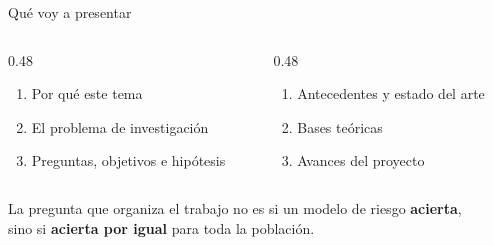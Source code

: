 \documentclass[aspectratio=169,11pt]{beamer}
\newcommand{\resalta}[1]{{\color{vino}\bfseries #1}}
\begin{document}
\begin{frame}{Qué voy a presentar}
  \vspace{0.6em}
  \begin{columns}[T,onlytextwidth]
    \begin{column}{0.48\textwidth}
      \begin{enumerate}
        \item[\textcolor{naranja}{\bfseries 1.}] Por qué este tema
        \item[\textcolor{naranja}{\bfseries 2.}] El problema de investigación
        \item[\textcolor{naranja}{\bfseries 3.}] Preguntas, objetivos e hipótesis
      \end{enumerate}
    \end{column}
    \begin{column}{0.48\textwidth}
      \begin{enumerate}
        \item[\textcolor{naranja}{\bfseries 4.}] Antecedentes y estado del arte
        \item[\textcolor{naranja}{\bfseries 5.}] Bases teóricas
        \item[\textcolor{naranja}{\bfseries 6.}] Avances del proyecto
      \end{enumerate}
    \end{column}
  \end{columns}

  \vspace{1.4em}
  \begin{center}
  \begin{minipage}{0.86\textwidth}
    \begin{block}{}
      \centering
      La pregunta que organiza el trabajo no es si un modelo de riesgo
      \resalta{acierta},\\ sino si \resalta{acierta por igual} para toda la
      población.
    \end{block}
  \end{minipage}
  \end{center}
\end{frame}
\end{document}

